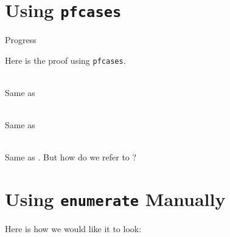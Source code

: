 \documentclass{article}
\begin{document}
\section{Using \texttt{pfcases}}

\begin{pftheorem}{Progress}
  \begin{pfstatement}

  \end{pfstatement}

  \begin{pfsketch}

  \end{pfsketch}

  \begin{pfproof}
    Here is the proof using \texttt{pfcases}.

    \begin{pfcases}

      \begin{pfcases}
      \end{pfcases}


      \begin{pfcases}

        \\
        Same as 

        \\
        Same as 
      \end{pfcases}

      \\
      Same as . But how do we refer to ?
    \end{pfcases}
  \end{pfproof}
\end{pftheorem}

\section{Using \texttt{enumerate} Manually}

Here is how we would like it to look:
\end{document}
